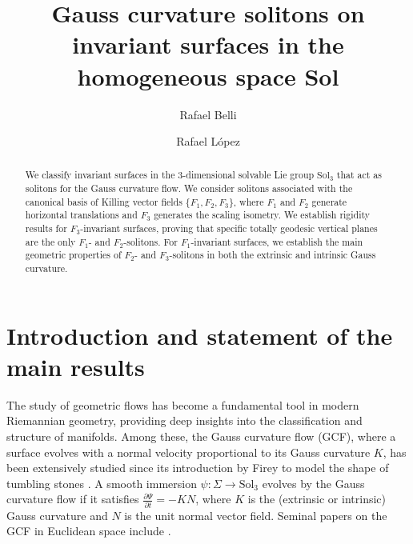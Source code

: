 \documentclass[a4paper,12pt]{amsart}
\theoremstyle{plain}
\theoremstyle{definition}
\def\sol{\text{Sol}_3}
\begin{document}
\title[Gauss curvature flow solitons in Sol]{Gauss curvature solitons on invariant surfaces in the homogeneous space Sol}
\author{Rafael Belli}
\address{Department of Mathematics. Federal University of São Carlos. 13565-905 São Carlos, Brazil}
\author{Rafael L\'opez}
\address{Department of Geometry and Topology. University of Granada. 18071 Granada, Spain}
\maketitle

 
\begin{abstract}

We classify invariant surfaces in the 3-dimensional solvable Lie group $\sol$ that act as solitons for the Gauss curvature flow. We consider solitons associated with the canonical basis of Killing vector fields $\{F_1, F_2, F_3\}$, where $F_1$ and $F_2$ generate horizontal translations and $F_3$ generates the scaling isometry. We establish rigidity results for $F_3$-invariant surfaces, proving that specific totally geodesic vertical planes are the only $F_1$- and $F_2$-solitons. For $F_1$-invariant surfaces, we establish the main geometric properties of $F_2$- and $F_3$-solitons in both the extrinsic and intrinsic Gauss curvature.
\end{abstract}

\section{Introduction and statement of the main results}
 
The study of geometric flows has become a fundamental tool in modern Riemannian geometry, 
providing deep insights into the classification and structure of manifolds. Among these, the Gauss curvature flow (GCF), where a surface evolves with a normal velocity proportional to its Gauss curvature $K$, has been 
extensively studied since its introduction by Firey to model the shape of tumbling stones \cite{firey}. A smooth immersion $\psi: \Sigma \to \sol$ evolves by the Gauss curvature flow if it satisfies $\frac{\partial \Psi}{\partial t} = -K N$, where $K$ is the (extrinsic or intrinsic) Gauss curvature and $N$ is the unit normal vector field. Seminal papers on the GCF in Euclidean space include \cite{an,ch,ts,ur}.
\end{document}
